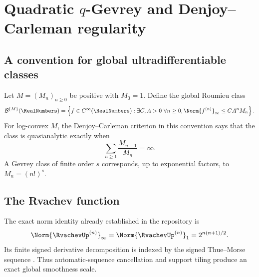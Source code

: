 \documentclass[11pt]{article}
\numberwithin{equation}{section}
\theoremstyle{definition}
\begin{document}
\section{Quadratic \texorpdfstring{$q$}{q}-Gevrey and Denjoy--Carleman regularity}\label{sec:carleman}

\subsection{A convention for global ultradifferentiable classes}
Let \(M=(M_n)_{n\ge0}\) be positive with \(M_0=1\).  Define the global Roumieu class
\begin{equation}\label{eq:roumieu-class}
 \mathcal B^{\{M\}}(\RealNumbers)=\left\{f\in C^\infty(\RealNumbers):
 \exists C,A>0\ \forall n\ge0,
 \Norm{f^{(n)}}_\infty\le CA^nM_n\right\}.
\end{equation}
For log-convex \(M\), the Denjoy--Carleman criterion in this convention \cite{Komatsu} says that the class is quasianalytic exactly when
\begin{equation}\label{eq:carleman-criterion}
 \sum_{n\ge1}\frac{M_{n-1}}{M_n}=\infty.
\end{equation}
A Gevrey class of finite order \(s\) corresponds, up to exponential factors, to \(M_n=(n!)^s\).

\subsection{The Rvachev function}
The exact norm identity already established in the repository \cite{RepoPrimary,RepoExponents} is
\begin{equation}\label{eq:up-exact-norm}
 \Norm{\RvachevUp^{(n)}}_\infty
 =\Norm{\RvachevUp^{(n)}}_1
 =2^{n(n+1)/2}.
\end{equation}
Its finite signed derivative decomposition is indexed by the signed Thue--Morse sequence \cite{AlloucheShallit,RepoExponents}.  Thus automatic-sequence cancellation and support tiling produce an exact global smoothness scale.
\end{document}
